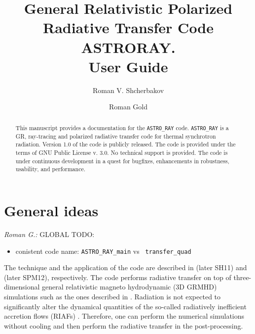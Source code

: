 \documentclass{emulateapj}
\newcommand{\rg}[1]{\color{blue}\textit{Roman G.:} #1\color{black}}
\begin{document}
\title{General Relativistic Polarized Radiative Transfer Code ASTRORAY. \\User Guide}

\author{Roman V. Shcherbakov}
\author{Roman Gold}


\setcounter{page}{1}


\begin{abstract}
This manuscript provides a documentation for the {\tt ASTRO\_RAY}
code. {\tt ASTRO\_RAY} is a GR, ray-tracing and polarized radiative
transfer code for thermal synchrotron radiation.
Version 1.0 of the code is publicly released.  The code is provided
under the terms of GNU Public License v. 3.0.  No technical support is provided.
The code is under continuous development in a quest for bugfixes,
enhancements in robustness, usability, and performance.
\end{abstract}



\section{General ideas}

\rg{GLOBAL TODO:
\begin{itemize}
  \item conistent code name: {\tt ASTRO\_RAY\_main} vs {\tt
    transfer\_quad}
\end{itemize}
}


The technique and the application of the code are described in
\citet{Shcherbakov:2011inter} (later SH11) and
\citet{Shcherbakov:2012appl} (later SPM12), respectively.  The code
performs radiative transfer on top of three-dimensional general
relativistic magneto hydrodynamic (3D GRMHD) simulations such as the
ones described in
\citet{Penna:2010dj,Tchekhovskoy:2011qp,McKinney2012,Narayan:2012dw}. Radiation
is not expected to significantly alter the dynamical quantities of the
so-called radiatively inefficient accretion flows (RIAFs)
\citep{Narayan:1998re,Quataert:2001op}. Therefore, one can perform the
numerical simulations without cooling and then perform the radiative
transfer in the post-processing.
\end{document}
